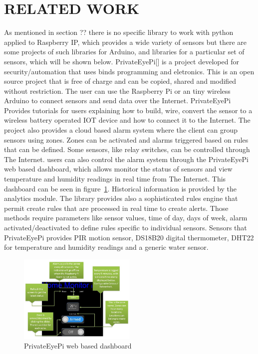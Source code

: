 \documentclass{acm_proc_article-sp}
\begin{document}
\section{RELATED WORK}
As mentioned in section ?? there is no specific library to work with python applied to Raspberry IP, which provides a wide variety of sensors but there are some projects of such libraries for Arduino, and libraries for a particular set of sensors, which will be shown below.
\newline
\newline
PrivateEyePi[] is a project developed for security/automation that uses binds programming and eletronics.%
This is an open source project that is free of charge and can be copied, shared and modified without restriction.
The user can use the Raspberry Pi or an tiny wireless Arduino to connect sensors and send data over the Internet.
\newline
\newline
PrivateEyePi Provides tutorials for users explaining how to build, wire, convert the sensor to a wireless battery operated IOT device and how to connect it to the Internet. The project also provides a cloud based alarm system where the client can group sensors using zones. Zones can be activated and alarms triggered based on rules that can be defined.
\newline
\newline
Some sensors, like relay switches, can be controlled through The Internet. users can also control the alarm system through the PrivateEyePi web based dashboard, which allows monitor the status of sensors and view temperature and humidity readings in real time from The Internet. This dashboard can be seen in figure~\ref{fig:PrivateEye}.
\newline
\newline
 Historical information is provided by the analytics module. The library provides also a sophisticated rules engine that permit create rules that are processed in real time to create alerts. Those methods require parameters like sensor values, time of day, days of week, alarm activated/deactivated to define rules specific to individual sensors.     
Sensors that PrivateEyePi provides PIR motion sensor, DS18B20 digital thermometer, DHT22 for temperature and humidity readings and a generic water sensor.
\begin{figure}[h]
    \includegraphics[width=0.5\textwidth,natwidth=610,natheight=642]{pictures/dashboardPrivateeye.png}
    \caption{PrivateEyePi web based dashboard}
    \label{fig:PrivateEye}
\end{figure}
\end{document}
